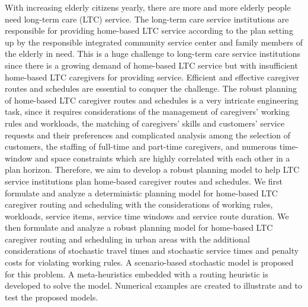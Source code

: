 
\begin{Abstrakt}
    With increasing elderly citizens yearly, there are more and more elderly people need long-term care (LTC) service. The long-term care service institutions are responsible for providing home-based LTC service according to the plan setting up by the responsible integrated community service center and family members of the elderly in need. This is a huge challenge to long-term care service institutions since there is a growing demand of home-based LTC service but with insufficient home-based LTC caregivers for providing service.  Efficient and effective caregiver routes and schedules are essential to conquer the challenge. The robust planning of home-based LTC caregiver routes and schedules is a very intricate engineering task, since it requires considerations of the management of caregivers’ working rules and workloads, the matching of caregivers’ skills and customers’ service requests and their preferences and complicated analysis among the selection of customers, the staffing of full-time and part-time caregivers, and numerous time-window and space constraints which are highly correlated with each other in a plan horizon. Therefore, we aim to develop a robust planning model to help LTC service institutions plan home-based caregiver routes and schedules. We first formulate and analyze a deterministic planning model for home-based LTC caregiver routing and scheduling with the considerations of working rules, workloads, service items, service time windows and service route duration. We then formulate and analyze a robust planning model for home-based LTC caregiver routing and scheduling in urban areas with the additional considerations of stochastic travel times and stochastic service times and penalty costs for violating working rules. A scenario-based stochastic model is proposed for this problem. A meta-heuristics embedded with a routing heuristic is developed to solve the model. Numerical examples are created to illustrate and to test the proposed models.
\end{Abstrakt}



\clearpage